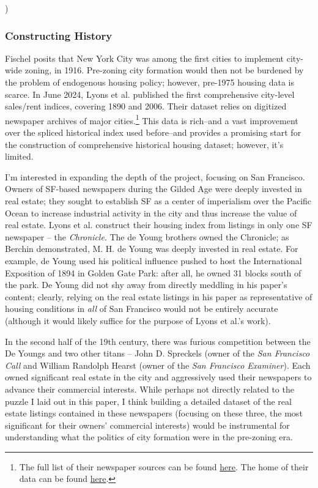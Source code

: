 )\documentclass{article}[11pt]
\begin{document}
		\subsubsection{Constructing History}
Fischel posits that New York City was among the first cities to implement city-wide zoning, in 1916. \citep{fischel2004economic} Pre-zoning city formation would then not be burdened by the problem of endogenous housing policy; however, pre-1975 housing data is scarce. In June 2024, Lyons et al. published the first comprehensive city-level sales/rent indices, covering 1890 and 2006. \citep{lyons2024price} Their dataset relies on digitized newspaper archives of major cities.\footnote{The full list of their newspaper sources can be found \href{https://www.philadelphiafed.org/surveys-and-data/data-sources}{here}. The home of their data can be found \href{https://www.philadelphiafed.org/surveys-and-data/regional-economic-analysis/historical-housing-prices}{here}.} This data is rich--and a vast improvement over the spliced historical index used before--and provides a promising start for the construction of comprehensive historical housing dataset; however, it's limited. 

I'm interested in expanding the depth of the project, focusing on San Francisco. Owners of SF-based newspapers during the Gilded Age were deeply invested in real estate; they sought to establish SF as a center of imperialism over the Pacific Ocean to increase industrial activity in the city and thus increase the value of real estate. \citep{brechin2006imperial} Lyons et al. construct their housing index from listings in only one SF newspaper -- the \textit{Chronicle}. The de Young brothers owned the Chronicle; as Berchin demonstrated, M. H. de Young was deeply invested in real estate. For example, de Young used his political influence pushed to host the International Exposition of 1894 in Golden Gate Park: after all, he owned 31 blocks south of the park. De Young did not shy away from directly meddling in his paper's content; clearly, relying on the real estate listings in his paper as representative of housing conditions in \textit{all} of San Francisco would not be entirely accurate (although it would likely suffice for the purpose of Lyons et al.'s work).

In the second half of the 19th century, there was furious competition between the De Youngs and two other titans -- John D. Spreckels (owner of the \textit{San Francisco Call} and William Randolph Hearst (owner of the \textit{San Francisco Examiner}). Each owned significant real estate in the city and aggressively used their newspapers to advance their commercial interests. While perhaps not directly related to the puzzle I laid out in this paper, I think building a detailed dataset of the real estate listings contained in these newspapers (focusing on these three, the most significant for their owners' commercial interests) would be instrumental for understanding what the politics of city formation were in the pre-zoning era.
\end{document}
